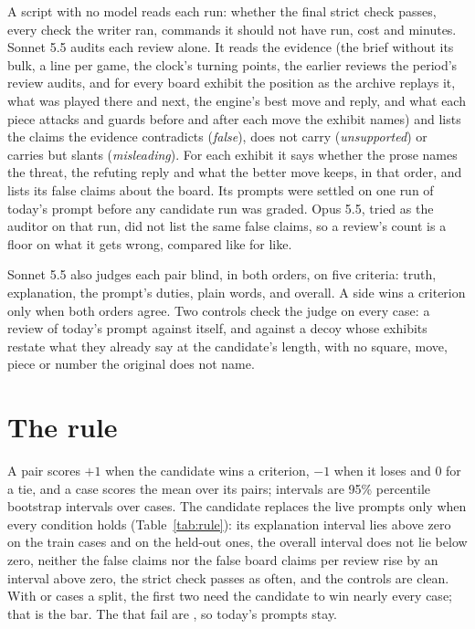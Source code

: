 \documentclass[11pt]{article}
\begin{document}
A script with no model reads each run: whether the final strict check passes, every check the
writer ran, commands it should not have run, cost and minutes. Sonnet 5.5 audits each review alone.
It reads the evidence (the brief without its bulk, a line per game, the clock's turning points, the
earlier reviews the period's review audits, and for every board exhibit the position as the archive
replays it, what was played there and next, the engine's best move and reply, and what each piece
attacks and guards before and after each move the exhibit names) and lists the claims the evidence
contradicts (\emph{false}), does not carry (\emph{unsupported}) or carries but slants
(\emph{misleading}). For each exhibit it says whether the prose names the threat, the refuting reply
and what the better move keeps, in that order, and lists its false claims about the board. Its
prompts were settled on one run of today's prompt before any candidate run was graded. Opus 5.5,
tried as the auditor on that run, did not list the same false claims, so a review's count is a floor
on what it gets wrong, compared like for like.

Sonnet 5.5 also judges each pair blind, in both orders, on five criteria: truth, explanation, the
prompt's duties, plain words, and overall. A side wins a criterion only when both orders agree.
Two controls check the judge on every case: a review of today's prompt against itself, and against
a decoy whose exhibits restate what they already say at the candidate's length, with no square,
move, piece or number the original does not name.

\section{The rule}

A pair scores $+1$ when the candidate wins a criterion, $-1$ when it loses and $0$ for a tie, and a
case scores the mean over its pairs; intervals are 95\% percentile bootstrap intervals over cases.
The candidate replaces the live prompts only when every condition holds
(Table~\ref{tab:rule}): its explanation interval lies above zero on the train cases and on the
held-out ones, the overall interval does not lie below zero, neither the false claims nor the false
board claims per review rise by an interval above zero, the strict check passes as often, and the
controls are clean. With \HeldN{} or \TrainN{} cases a split, the first two need the candidate to
win nearly every case; that is the bar. The \RuleFailedN{} that fail are \RuleFailed, so today's prompts stay.
\end{document}
